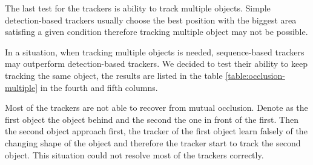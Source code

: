 The last test for the trackers is ability to track multiple objects. Simple
detection-based trackers usually choose the best position with the biggest area
satisfing a given condition therefore tracking multiple object may not be possible.

In a situation, when tracking multiple objects is needed, sequence-based
trackers may outperform detection-based trackers. We decided to test their
ability to keep tracking the same object, the results are listed in the table
\ref{table:occlusion-multiple} in the fourth and fifth columns.

Most of the trackers are not able to recover from mutual occlusion. Denote as
the first object the object behind and the second the one in front of the
first. Then the second object approach first, the tracker of the first object
learn falsely of the changing shape of the object and therefore the tracker start
to track the second object. This situation could not resolve most of the
trackers correctly.

